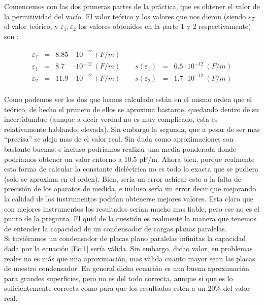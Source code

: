 \documentclass[12pt,a4paper]{article}
\begin{document}
Comencemos con las dos primeras partes de la práctica, que es obtener el valor de la permitividad del vacío. El valor teórico y los valores que nos dieron (siendo $\varepsilon_T$ el valor teórico, y $\varepsilon_1, \varepsilon_2$ los valores obtenidos en la parte 1 y 2 respectivamente) son :


\begin{equation} 
\begin{array}{llclllll}
\varepsilon_T   & = & 8.85 & \cdot 10^{-12} \ (F/m)  &  \ \ &   &   &   \\ 
\varepsilon_1 & = & 8.7 & \cdot 10^{-12} \ (F/m)  &  \ \ &  s(\varepsilon_1) & =  & 6.5 \cdot 10^{-12} \ (F/m)   \\ 
\varepsilon_2  & = & 11.9 & \cdot 10^{-12} \ (F/m) &  \ \ &  s(\varepsilon_2) & =  & 1.7  \cdot 10^{-12} \ (F/m)  \\ 
\end{array} 
\end{equation} 

Como podemos ver los dos que hemos calculado están en el mismo orden que el teórico, de hecho el primero de ellos se aproxima bastante, quedando dentro de su incertidumbre (aunque a decir verdad no es muy complicado, esta es relativamente hablando, elevada). Sin embargo la segunda, que a pesar de ser mas ``precisa'' se aleja mas de el valor real. Sin duda como aproximaciones son bastante buenas, e incluso podríamos realizar una media ponderada donde podríamos obtener un valor entorno a 10.5  pF/m. Ahora bien, porque realmente esta forma de calcular la constante dieléctrica no es todo lo exacta que se pudiera (solo se aproxima en el orden). Bien, sería un error achicar esto a la falta de precisión de los aparatos de medida, e incluso sería un error decir que mejorando la calidad de los instrumentos podrían obtenerse mejores valores. Esta claro que con mejores instrumentos los resultados serían mucho mas fiable, pero ese no es el punto de la pregunta. El quid de la cuestión es realmente la manera que tenemos de entender la capacidad de un condensador de cargas planas paralelas. \\

Si tuviéramos un condensador de placas plano paralelas infinitas la capacidad dada por la ecuación \ref{Ec:1} sería válida. Sin embargo, dicho valor, en problemas reales no es más que una aproximación, mas válida cuanto mayor sean las placas de nuestro condensador. En general dicha ecuación es una buena aproximación para grandes superficies, pero no es del todo correcta, aunque si que es lo suficientemente correcta  como para que los resultados estén a un $20 \%$ del valor real. \\
\end{document}
